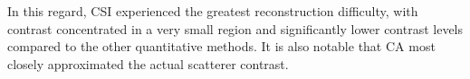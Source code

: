 \documentclass{IEEEtran}
\begin{document}
                In this regard, CSI experienced the greatest reconstruction difficulty, with contrast concentrated in a very small region and significantly lower contrast levels compared to the other quantitative methods. It is also notable that CA most closely approximated the actual scatterer contrast.

                \begin{figure}[!htb]
                     \\

\end{figure}
\end{document}
